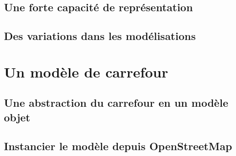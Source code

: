 \subsection{Une forte capacité de représentation}

\todo{}

\subsection{Des variations dans les modélisations}

\todo{}

\section{Un modèle de carrefour}

\todo{}

\subsection{Une abstraction du carrefour en un modèle objet}

\todo{}

\subsection{Instancier le modèle depuis OpenStreetMap}

\todo{}
